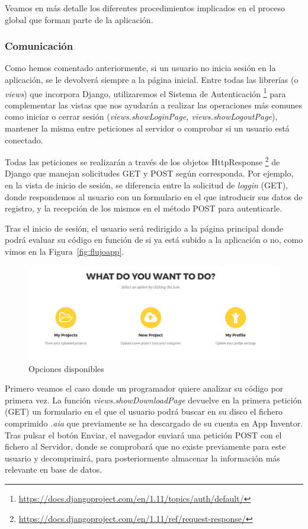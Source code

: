 \documentclass[a4paper, 12pt]{book}
\begin{document}
Veamos en más detalle los diferentes procedimientos implicados en el proceso global que forman parte de la aplicación.
\subsubsection{Comunicación}
Como hemos comentado anteriormente, si un usuario no inicia sesión en la aplicación, se le devolverá siempre a la página inicial. Entre todas las librerías (o \textit{views}) que incorpora Django, utilizaremos el Sistema de Autenticación \footnote{\url{https://docs.djangoproject.com/en/1.11/topics/auth/default/}} para complementar las vistas que nos ayudarán a realizar las operaciones más comunes como iniciar o cerrar sesión (\textit{views.showLoginPage, views.showLogoutPage}), mantener la misma entre peticiones al servidor o comprobar si un usuario está conectado. 

Todas las peticiones se realizarán a través de los objetos HttpResponse \footnote{\url{https://docs.djangoproject.com/en/1.11/ref/request-response/}} de Django que manejan solicitudes GET y POST según corresponda. Por ejemplo, en la vista de inicio de sesión, se diferencia entre la solicitud de \textit{loggin} (GET), donde respondemos al usuario con un formulario en el que introducir sus datos de registro, y la recepción de los mismos en el método POST para autenticarle. 

Tras el inicio de sesión, el usuario será redirigido a la página principal donde podrá evaluar su código en función de si ya está subido a la aplicación o no, como vimos en la Figura~\ref{fig:flujoapp}. 

\begin{figure}[H]
  \centering
  \includegraphics[width=\linewidth, keepaspectratio]{img/usercontent}
  \caption{Opciones disponibles}
  \label{fig:usercontent}
\end{figure}

Primero veamos el caso donde un programador quiere analizar su código por primera vez. La función \textit{views.showDownloadPage} devuelve en la primera petición (GET) un formulario en el que el usuario podrá buscar en su disco el fichero comprimido \textit{.aia} que previamente se ha descargado de su cuenta en App Inventor. Tras pulsar el botón Enviar, el navegador enviará una petición POST con el fichero al Servidor, donde se comprobará que no existe previamente para este usuario y decomprimirá, para posteriormente almacenar la información más relevante en base de datos. 
\end{document}
